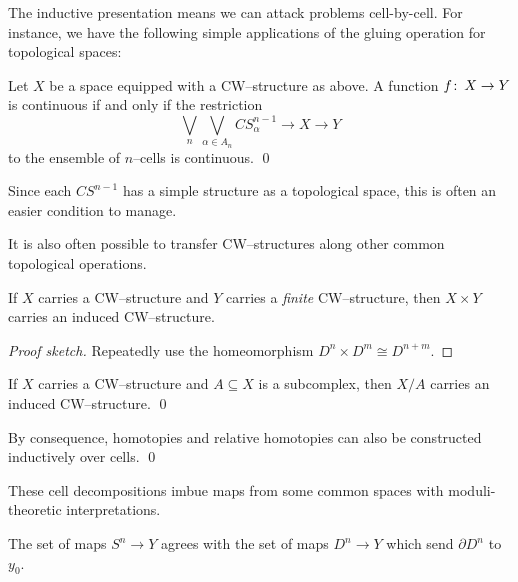 The inductive presentation means we can attack problems cell-by-cell.
For instance, we have the following simple applications of the gluing operation for topological spaces:
\begin{corollary}
Let $X$ be a space equipped with a CW--structure as above.
A function $f\colon\thinspace X \to Y$ is continuous if and only if the restriction \[\bigvee_n \bigvee_{\alpha \in A_n} CS^{n-1}_\alpha \to X \to Y\] to the ensemble of $n$--cells is continuous. \qed
\end{corollary}

\noindent
Since each $CS^{n-1}$ has a simple structure as a topological space, this is often an easier condition to manage.

It is also often possible to transfer CW--structures along other common topological operations.

\begin{lemma}
If $X$ carries a CW--structure and $Y$ carries a \emph{finite} CW--structure, then $X \times Y$ carries an induced CW--structure.
\end{lemma}
\begin{proof}[Proof sketch]
Repeatedly use the homeomorphism $D^n \times D^m \cong D^{n+m}$.
\end{proof}

\begin{lemma}
If $X$ carries a CW--structure and $A \subseteq X$ is a subcomplex, then $X/A$ carries an induced CW--structure. \qed
\end{lemma}

\begin{corollary}
By consequence, homotopies and relative homotopies can also be constructed inductively over cells. \qed
\end{corollary}

These cell decompositions imbue maps from some common spaces with moduli-theoretic interpretations.

\begin{example}
The set of maps $S^n \to Y$ agrees with the set of maps $D^n \to Y$ which send $\partial D^n$ to $y_0$.
\end{example}

